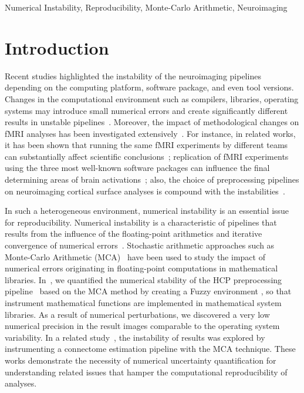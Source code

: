 \documentclass[conference]{IEEEtran}
\begin{document}
\begin{IEEEkeywords}
  Numerical Instability, Reproducibility, Monte-Carlo Arithmetic, Neuroimaging
\end{IEEEkeywords}


\section{Introduction}

Recent studies highlighted the instability of the neuroimaging pipelines depending on the computing platform,
software package, and even tool versions. Changes in the computational
environment such as compilers, libraries, operating systems may introduce small numerical errors and create
significantly different results in unstable pipelines~\cite{Glatard2015,Gronenschild2012,salari2020spot}.
Moreover, the impact of methodological changes on fMRI analyses has been investigated extensively~\cite{bowring2019exploring,botvinik2020variability,bhagwat2021understanding,carp2012plurality}.
For instance, in related works, it has been shown that running the same fMRI experiments by different teams can substantially affect
scientific conclusions~\cite{botvinik2020variability,carp2012plurality};
replication of fMRI experiments using the three most well-known software packages can influence the final determining areas of
brain activations~\cite{bowring2019exploring};%
also, the choice of preprocessing pipelines on neuroimaging cortical surface analyses is compound with the instabilities~\cite{bhagwat2021understanding}.

In such a heterogeneous environment, numerical instability is an essential issue for reproducibility.
Numerical instability is a characteristic of pipelines that results from the influence of the floating-point arithmetics
and iterative convergence of numerical errors~\cite{freitas2002issue}.
Stochastic arithmetic approaches such as Monte-Carlo Arithmetic (MCA)~\cite{Parker1997-qq} have been used to study the impact of numerical errors
originating in floating-point computations in mathematical libraries.
In~\cite{salari2021accurate}, we quantified the numerical stability of the HCP preprocessing pipeline~\cite{glasser2013} based on the MCA method by creating a Fuzzy environment
, so that instrument mathematical functions are implemented in mathematical system libraries.
As a result of numerical perturbations, we discovered a very low numerical precision in the result images comparable to the operating system variability.
In a related study~\cite{kiar2020numerical}, the instability of results was explored by instrumenting a connectome estimation pipeline with the MCA technique.
These works demonstrate the necessity of numerical uncertainty quantification for understanding related issues that hamper the computational reproducibility of analyses.
\end{document}
